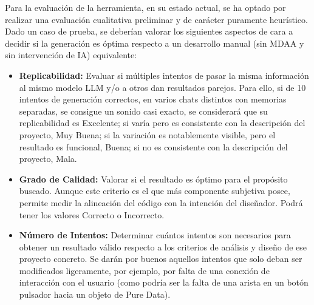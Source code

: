 Para la evaluación de la herramienta, en su estado actual, se ha optado por realizar una evaluación cualitativa preliminar y de carácter puramente heurístico. Dado un caso de prueba, se deberían valorar los siguientes aspectos de cara a decidir si la generación es óptima respecto a un desarrollo manual (sin MDAA y sin intervención de IA) equivalente:

\begin{itemize}
    \item \textbf{Replicabilidad:} Evaluar si múltiples intentos de pasar la misma información al mismo modelo LLM y/o a otros dan resultados parejos. Para ello, si de 10 intentos de generación correctos, en varios chats distintos con memorias separadas, se consigue un sonido casi exacto, se considerará que su replicabilidad es Excelente; si varía pero es consistente con la descripción del proyecto, Muy Buena; si la variación es notablemente visible, pero el resultado es funcional, Buena; si no es consistente con la descripción del proyecto, Mala.
    \item \textbf{Grado de Calidad:} Valorar si el resultado es óptimo para el propósito buscado. Aunque este criterio es el que más componente subjetiva posee, permite medir la alineación del código con la intención del diseñador. Podrá tener los valores Correcto o Incorrecto. 
    \item \textbf{Número de Intentos:} Determinar cuántos intentos son necesarios para obtener un resultado válido respecto a los criterios de análisis y diseño de ese proyecto concreto. Se darán por buenos aquellos intentos que solo deban ser modificados ligeramente, por ejemplo, por falta de una conexión de interacción con el usuario (como podría ser la falta de una arista en un botón pulsador hacia un objeto de Pure Data).
\end{itemize}

